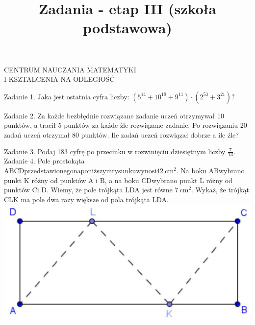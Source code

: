 \documentclass[10pt]{article}
\title{Zadania - etap III (szkoła podstawowa) }
\author{}
\date{}
\begin{document}
\maketitle
CENTRUM NAUCZANIA MATEMATYKI\\
I KSZTALCENIA NA ODLEGłOŚĆ

Zadanie 1. Jaka jest ostatnia cyfra liczby: \(\left(5^{14}+10^{19}+9^{11}\right) \cdot\left(2^{53}+3^{21}\right) ?\)

Zadanie 2. Za każde bezbłędnie rozwiązane zadanie uczeń otrzymywał 10 punktów, a tracił 5 punktów za każde żle rozwiązane zadanie. Po rozwiązaniu 20 zadań uczeń otrzymał 80 punktów. Ile zadań uczeń rozwiązał dobrze a ile źle?

Zadanie 3. Podaj 183 cyfrę po przecinku w rozwinięciu dziesiętnym liczby \(\frac{7}{13}\).\\
Zadanie 4. Pole prostokąta \(\mathrm{ABCDprzedstawionego} \mathrm{na} \mathrm{poniższym} \mathrm{rysunku} \mathrm{wynosi} 42 \mathrm{~cm}^{2}\). Na boku ABwybrano punkt K różny od punktów A i B, a na boku CDwybrano punkt L różny od punktów Ci D. Wiemy, że pole trójkąta LDA jest równe \(7 \mathrm{~cm}^{2}\). Wykaż, że trójkąt CLK ma pole dwa razy większe od pola trójkąta LDA.\\
\includegraphics[max width=\textwidth, center]{2024_11_21_0222b9f9dea886a5ae2eg-1}
\end{document}
